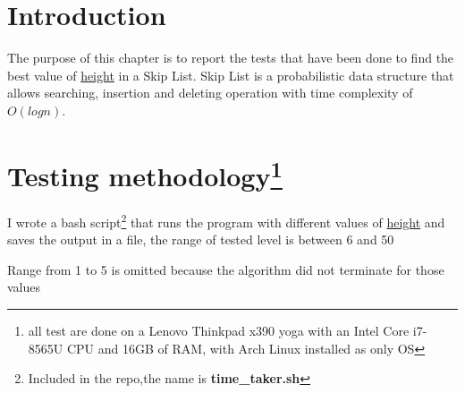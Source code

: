 \section{Introduction}
The purpose of this chapter is to report the tests that have been done to find the best value of \underline{height} in a Skip List.
Skip List is a probabilistic data structure that allows searching, insertion and deleting operation with time complexity of $O(log n)$.

\section{Testing methodology\footnote{all test are done on a Lenovo Thinkpad x390 yoga with an Intel Core i7-8565U CPU and 16GB of RAM, with Arch Linux installed as only OS}}
I wrote a bash script\footnote{Included in the repo,the name is \textbf{time\_taker.sh}} that runs the program with different values of \underline{height} and saves the output in a file, the range of tested level is between 6 and 50
\newline
{}


\newline
Range from 1 to 5 is omitted because the algorithm did not terminate for those values

